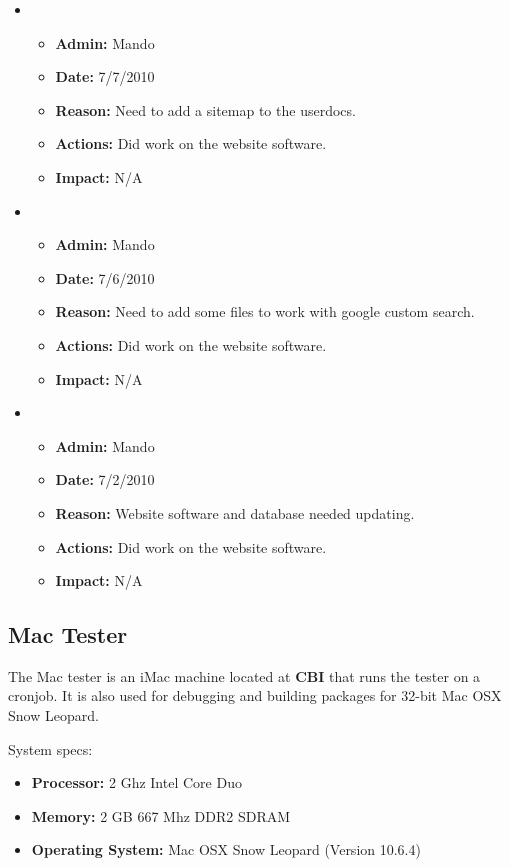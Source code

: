 \documentclass[12pt]{article}
\begin{document}
\begin{itemize}
\item 
\begin{itemize}
\item[] {\bf Admin:} Mando
\item[] {\bf Date:} 7/7/2010
\item[] {\bf Reason:} Need to add a sitemap to the userdocs.
\item[] {\bf Actions:} Did work on the website software. 
\item[] {\bf Impact:} N/A
\end{itemize}

\item 
\begin{itemize}
\item[] {\bf Admin:} Mando
\item[] {\bf Date:} 7/6/2010
\item[] {\bf Reason:} Need to add some files to work with google custom search.
\item[] {\bf Actions:} Did work on the website software. 
\item[] {\bf Impact:} N/A
\end{itemize}

\item 
\begin{itemize}
\item[] {\bf Admin:} Mando
\item[] {\bf Date:} 7/2/2010
\item[] {\bf Reason:} Website software and database needed updating.
\item[] {\bf Actions:} Did work on the website software. 
\item[] {\bf Impact:} N/A
\end{itemize}
\end{itemize}

\subsection*{Mac Tester}

The Mac tester is an iMac machine located at {\bf CBI} that runs the tester on a cronjob. It is also used for debugging and building packages for 32-bit Mac OSX Snow Leopard.

System specs:
\begin{itemize}
\item[] {\bf Processor:} 2 Ghz Intel Core Duo
\item[] {\bf Memory:} 2 GB 667 Mhz DDR2 SDRAM
\item[] {\bf Operating System:} Mac OSX Snow Leopard (Version 10.6.4) 
\end{itemize}
\end{document}
